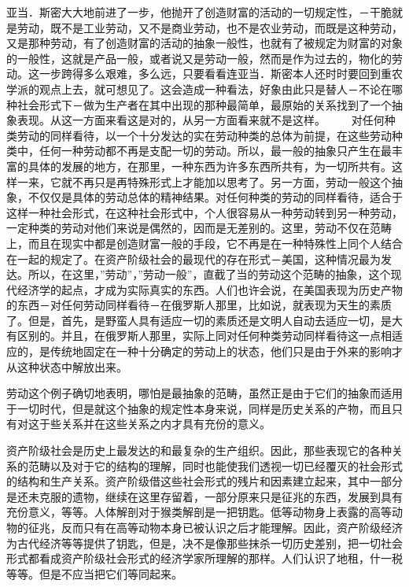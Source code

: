 \documentclass[a4paper,twoside,12pt,AutoFakeBold]{ctexart}
\begin{document}
亚当．斯密大大地前进了一步，他抛开了创造财富的活动的一切规定性，－干脆就是劳动，既不是工业劳动，又不是商业劳动，也不是农业劳动，而既是这种劳动，又是那种劳动，有了创造财富的活动的抽象一般性，也就有了被规定为财富的对象的一般性，这就是产品一般，或者说又是劳动一般，然而是作为过去的，物化的劳动。这一步跨得多么艰难，多么远，只要看看连亚当．斯密本人还时时要回到重农学派的观点上去，就可想见了。这会造成一种看法，好象由此只是替人－不论在哪种社会形式下－做为生产者在其中出现的那种最简单，最原始的关系找到了一个抽象表现。从这一方面来看这是对的，从另一方面看来就不是这样。
　　对任何种类劳动的同样看待，以一个十分发达的实在劳动种类的总体为前提，在这些劳动种类中，任何一种劳动都不再是支配一切的劳动。所以，最一般的抽象只产生在最丰富的具体的发展的地方，在那里，一种东西为许多东西所共有，为一切所共有。这样一来，它就不再只是再特殊形式上才能加以思考了。另一方面，劳动一般这个抽象，不仅仅是具体的劳动总体的精神结果。对任何种类的劳动的同样看待，适合于这样一种社会形式，在这种社会形式中，个人很容易从一种劳动转到另一种劳动，一定种类的劳动对他们来说是偶然的，因而是无差别的。这里，劳动不仅在范畴上，而且在现实中都是创造财富一般的手段，它不再是在一种特殊性上同个人结合在一起的规定了。在资产阶级社会的最现代的存在形式－美国，这种情况最为发达。所以，在这里，”劳动”，”劳动一般”，直截了当的劳动这个范畴的抽象，这个现代经济学的起点，才成为实际真实的东西。人们也许会说，在美国表现为历史产物的东西－对任何劳动同样看待－在俄罗斯人那里，比如说，就表现为天生的素质了。但是，首先，是野蛮人具有适应一切的素质还是文明人自动去适应一切，是大有区别的。并且，在俄罗斯人那里，实际上同对任何种类劳动同样看待这一点相适应的，是传统地固定在一种十分确定的劳动上的状态，他们只是由于外来的影响才从这种状态中解放出来。

劳动这个例子确切地表明，哪怕是最抽象的范畴，虽然正是由于它们的抽象而适用于一切时代，但是就这个抽象的规定性本身来说，同样是历史关系的产物，而且只有对这于些关系并在这些关系之内才具有充份的意义。

资产阶级社会是历史上最发达的和最复杂的生产组织。因此，那些表现它的各种关系的范畴以及对于它的结构的理解，同时也能使我们透视一切已经覆灭的社会形式的结构和生产关系。资产阶级借这些社会形式的残片和因素建立起来，其中一部分是还未克服的遗物，继续在这里存留着，一部分原来只是征兆的东西，发展到具有充份意义，等等。人体解剖对于猴类解剖是一把钥匙。低等动物身上表露的高等动物的征兆，反而只有在高等动物本身已被认识之后才能理解。因此，资产阶级经济为古代经济等等提供了钥匙，但是，决不是像那些抹杀一切历史差别，把一切社会形式都看成资产阶级社会形式的经济学家所理解的那样。人们认识了地租，什一税等等。但是不应当把它们等同起来。
\end{document}
